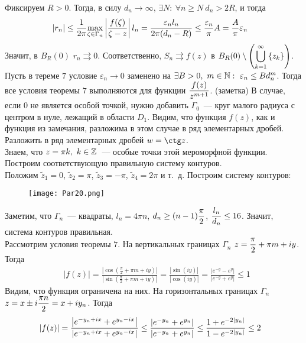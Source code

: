 Фиксируем $R>0$. Тогда, в силу $d_n \to \infty$, $\exists N: \ \forall n \geq N
\ d_n > 2R$, и тогда
\begin{align*}
  & \left| r_n \right| \leq \frac{1}{2\pi}\underset{\zeta \in \Gamma_n}{\max}\left| \frac{f(\zeta)}{\zeta - z} \right| l_n = \frac{\varepsilon_n l_n}{2\pi (d_n - R)} \leq \frac{\varepsilon_n}{\pi}A = \frac{A}{\pi}\varepsilon_n
\end{align*}
Значит, в $B_R(0)$ $r_n \rightrightarrows 0$. Соответственно, $S_n
\rightrightarrows f(z)$ в $B_R(0) \setminus \left( \displaystyle
    \bigcup_{k=1}^{\infty}\left\{ z_k \right\} \right)$.
\Note
Пусть в тереме $7$ условие $\varepsilon_n \to 0$ заменено на $\exists B > 0, \ m
\in \mathbb{N}: \ \varepsilon_n \leq Bd_n^m$. Тогда все условия теоремы $7$ выполняются
для функции $\displaystyle \frac{f(z)}{z^{m+1}}$.
\pr (заметка)
В случае, если $0$ не является особой точкой, нужно добавить $\Gamma_0$~--- круг
малого радиуса с центром в нуле, лежащий в области $D_1$. Видим, что функция
$f(z)$, как и функция из замечания, разложима в этом случае в ряд элементарных
дробей.
\Example
Разложить в ряд элементарных дробей $w = \ctg z$.
\\
Знаем, что $z = \pi k, \ k \in \mathbb{Z}$~--- особые точки этой мероморфной функции.
Построим соответствующую правильную систему контуров.
\\
Положим $\tilde{z}_1 = 0$, $\tilde{z}_2 = \pi$, $\tilde{z}_3 = -\pi$,
$\tilde{z}_4 = 2 \pi$ и т.~д. Построим систему контуров:
\begin{figure}[h!]
		\centering
		\texttt{[image: Par20.png]}
		\label{fig:20.1}
\end{figure}
Заметим, что $\Gamma_n$~--- квадраты, $l_n = 4\pi n$, $d_n \geq (n-1)\displaystyle
\frac{\pi}{2}$, $\displaystyle \frac{l_n}{d_n}\leq 16$. Значит, система контуров
правильная.
\\
Рассмотрим условия теоремы $7$. На вертикальных границах $\Gamma_n$ $z = \displaystyle
\frac{\pi}{2} + \pi m + iy$. Тогда
\begin{align*}
  & \left| f(z) \right| = \frac{\left| \cos\left( \frac{\pi}{2}+\pi m + iy \right) \right|}{\left| \sin\left( \frac{\pi}{2}+\pi m + iy \right) \right|} = \frac{\left| \sin(iy) \right|}{\left| \cos(iy) \right|} = \frac{\left| e^{-y} - e^y \right|}{\left| e^{-y}+e^y \right|} \leq 1
\end{align*}
Видим, что функция ограничена на них. На горизонтальных границах $\Gamma_n$ $z =
x \pm i \displaystyle \frac{\pi n}{2} = x+iy_n$. Тогда
\begin{align*}
  & \left| f(z) \right| = \frac{\left| e^{-y_n+ix}+e^{y_n-ix} \right|}{\left| e^{-y_n+ix}+e^{y_n-ix} \right|} \leq \frac{\left| e^{-y_n}+e^{y_n} \right|}{\left| e^{-y_n}+e^{y_n} \right|} \leq \frac{ 1+e^{-2\left|{y_n}\right|}}{ 1-e^{-2\left|{y_n}\right|}} \leq 2
\end{align*}
